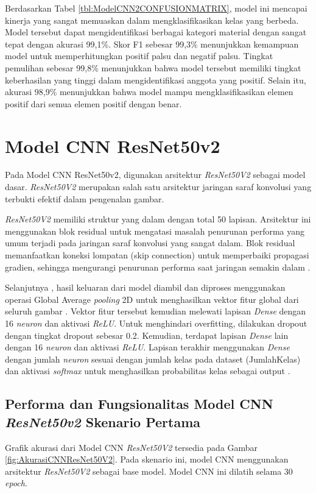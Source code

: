 Berdasarkan Tabel \ref{tbl:ModelCNN2CONFUSIONMATRIX}, model ini mencapai kinerja yang sangat memuaskan dalam mengklasifikasikan kelas yang berbeda. Model tersebut dapat mengidentifikasi berbagai kategori material dengan sangat tepat dengan akurasi 99,1\%. Skor F1 sebesar 99,3\% menunjukkan kemampuan model untuk memperhitungkan positif palsu dan negatif palsu. Tingkat pemulihan sebesar 99,8\% menunjukkan bahwa model tersebut memiliki tingkat keberhasilan yang tinggi dalam mengidentifikasi anggota yang positif. Selain itu, akurasi 98,9\% menunjukkan bahwa model mampu mengklasifikasikan elemen positif dari semua elemen positif dengan benar. 


\section{Model CNN ResNet50v2}
Pada Model CNN ResNet50v2, digunakan arsitektur \textit{ResNet50V2 }sebagai model dasar. \textit{ResNet50V2 }merupakan salah satu arsitektur jaringan saraf konvolusi yang terbukti efektif dalam pengenalan gambar.

\textit{ResNet50V2 }memiliki struktur yang dalam dengan total 50 lapisan. Arsitektur ini menggunakan blok residual untuk mengatasi masalah penurunan performa yang umum terjadi pada jaringan saraf konvolusi yang sangat dalam. Blok residual memanfaatkan koneksi lompatan (skip connection) untuk memperbaiki propagasi gradien, sehingga mengurangi penurunan performa saat jaringan semakin dalam . 

Selanjutnya , hasil keluaran dari model diambil dan diproses menggunakan operasi Global Average \textit{pooling} 2D untuk menghasilkan vektor fitur global dari seluruh gambar . Vektor fitur tersebut kemudian melewati lapisan \textit{Dense} dengan 16 \textit{neuron} dan aktivasi \textit{ReLU}. Untuk menghindari overfitting, dilakukan dropout dengan tingkat dropout sebesar 0.2. Kemudian, terdapat lapisan \textit{Dense} lain dengan 16 \textit{neuron} dan aktivasi \textit{ReLU}. Lapisan terakhir menggunakan \textit{Dense} dengan jumlah \textit{neuron} sesuai dengan jumlah kelas pada dataset (JumlahKelas) dan aktivasi \textit{softmax} untuk menghasilkan probabilitas kelas sebagai output . 

\subsection*{Performa dan Fungsionalitas Model CNN \textit{ResNet50v2 }Skenario Pertama}

Grafik akurasi dari Model CNN \textit{ResNet50V2 }tersedia pada Gambar \ref{fig:AkurasiCNNResNet50V2}. Pada skenario ini, model CNN menggunakan arsitektur \textit{ResNet50V2 }sebagai base model. Model CNN ini dilatih selama 30\textit{ epoch}.

